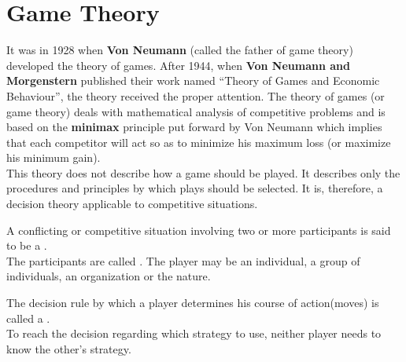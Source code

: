 \documentclass[../main-sheet.tex]{subfiles}
\begin{document}
\chapter{Game Theory}
It was in 1928 when \textbf{Von Neumann} (called the father of game theory) developed the theory of games. After 1944, when \textbf{Von Neumann and Morgenstern} published their work named  ``Theory of Games and Economic Behaviour'',  the  theory received the proper  attention.  The  theory  of  games  (or  game  theory)  deals  with  mathematical analysis of competitive problems and is based on the \textbf{minimax} principle put forward by  Von  Neumann which  implies  that  each  competitor  will  act  so  as  to  minimize his maximum loss (or maximize his minimum gain).\\
This theory does not describe how a game should be played. It describes only the procedures and principles by which plays should be selected. It is, therefore, a decision theory applicable to competitive situations.
\begin{defn}
    A conflicting or competitive situation involving two or more participants is said to be a .\\
    The participants are called . The player may be an individual, a group of individuals, an organization or the nature.
\end{defn}
\begin{defn}[Strategy]
    The decision rule by which a player determines his course of action(moves) is called a .\\
    To reach the decision regarding which strategy to use, neither player needs to know the other's strategy.
\end{defn}
\end{document}
